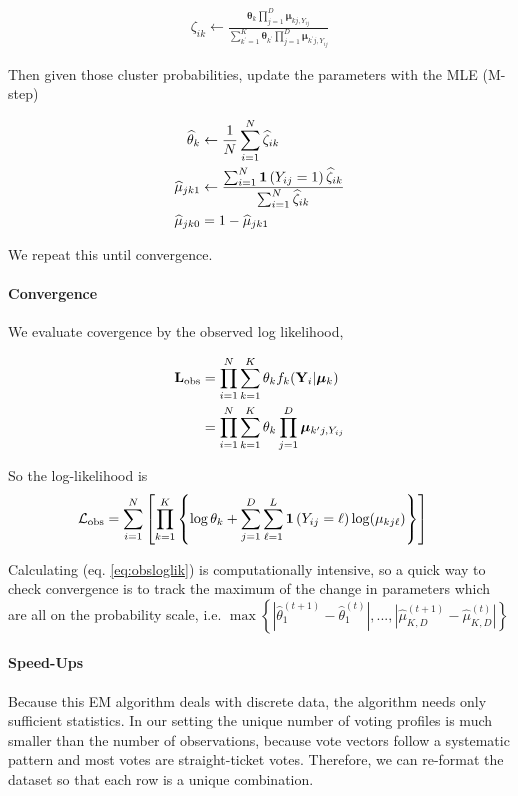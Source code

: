 \documentclass[11pt]{article}
\begin{document}
\begin{align}
\zeta_{ik} \leftarrow \frac{\bm{\theta}_{k}\prod^{D}_{j=1}\bm{\mu}_{kj,Y_{ij}}}
{\sum^{K}_{k^\prime=1}\bm{\theta}_{k^\prime}\prod^{D}_{j=1}\bm{\mu}_{k^\prime j,Y_{ij}}}
\end{align}

Then given those cluster probabilities, update the parameters with the MLE (M-step)

\begin{align}
\widehat{\theta}_{k} &\leftarrow \frac{1}{N}\sum^N_{i = 1}\widehat{\zeta}_{ik}\\
\widehat{\mu}_{jk1} &\leftarrow\frac{\sum^N_{i=1}\bm{1}\left(Y_{ij} = 1\right)\widehat{\zeta}_{ik}}{\sum^{N}_{i=1}\widehat{\zeta}_{ik}}\\
\widehat{\mu}_{jk0} &= 1 - \widehat{\mu}_{jk1}
\end{align}

We repeat this until convergence.

\paragraph{Convergence} We evaluate covergence by the observed log likelihood, 

\begin{align*}
\mathbf{L}_{\text{obs}} &= \prod^{N}_{i=1}\sum^K_{k=1}\theta_k f_{k}(\mathbf{Y}_{i} | \bm{\mu}_{k})\\
&= \prod^N_{i=1}\sum^{K}_{k=1}\theta_k \prod^{D}_{j=1}\bm{\mu}_{k^\prime j,Y_{ij}}
\end{align*}

So the log-likelihood is
\begin{align}
\mathcal{L}_{\text{obs}} &= \sum^{N}_{i=1}\left[\prod^{K}_{k=1}\left\{\log\theta_{k} + \sum^D_{j=1}\sum^L_{\ell=1}\bm{1}\left(Y_{ij} = \ell\right)\log(\mu_{kj\ell})\right\}\right]\label{eq:obsloglik}
\end{align}

Calculating (eq. \ref{eq:obsloglik}) is computationally intensive, so a quick way to check convergence is to track the maximum of the change in parameters which are all on the probability scale, i.e. \(\max\left\{|\widehat\theta^{(t + 1)}_{1} - \widehat\theta^{(t)}_{1}|, ..., |\widehat\mu^{(t + 1)}_{K,D} - \widehat\mu^{(t)}_{K,D}|\right\}\)

\paragraph{Speed-Ups} Because this EM algorithm deals with discrete data, the algorithm needs only sufficient statistics. In our setting the unique number of voting profiles is much smaller than the number of observations, because vote vectors follow a systematic pattern and most votes are straight-ticket votes. Therefore, we can re-format the dataset so that each row is a unique combination.
\end{document}
